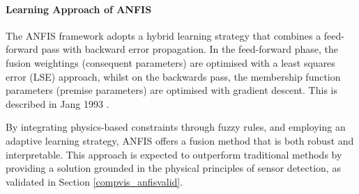     
    \paragraph{Learning Approach of ANFIS}
    
        The ANFIS framework adopts a hybrid learning strategy that combines a feed-forward pass with backward error propagation. In the feed-forward phase, the fusion weightings (consequent parameters) are optimised with a least squares error (LSE) approach, whilst on the backwards pass, the membership function parameters (premise parameters) are optimised with gradient descent. This is described in Jang 1993 \cite{jang1993anfis}.
        
    
    By integrating physics-based constraints through fuzzy rules, and employing an adaptive learning strategy, ANFIS offers a fusion method that is both robust and interpretable. This approach is expected to outperform traditional methods by providing a solution grounded in the physical principles of sensor detection, as validated in Section \ref{compvis_anfisvalid}.
    